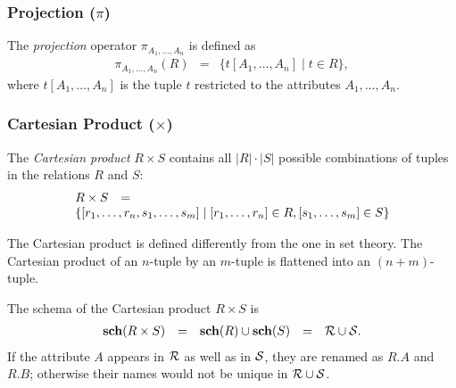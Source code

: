 

\subsubsection[Projection]{Projection ($\pi$)}

The \emph{projection} operator $\pi_{A_1, \ldots, A_n}$ is defined as
\[ \begin{array}{rcl}
\pi_{A_1, \ldots, A_n}(R) & = & \{ t[A_1, \ldots, A_n] \mid t \in R \},
\end{array} \]
where $t[A_1,\ldots,A_n]$ is the tuple $t$ restricted to the attributes $A_1, \ldots, A_n$.




\subsubsection[Cartesian Product]{Cartesian Product ($\times$)}

The  \emph{Cartesian product} $R \times S$ contains all $|R| \cdot |S|$ possible combinations of tuples in the relations $R$ and $S$:
\[ \hspace{-0.5em} \begin{array}{ll}
R \times S & = \\
\multicolumn{2}{l}{\{ [r_1,\ldots,r_n,s_1,\ldots,s_m] \mid [r_1,\ldots,r_n] \in R, [s_1,\ldots,s_m] \in S \}}
\end{array} \hspace{-0.5em} \]

\begin{note}
The Cartesian product is defined differently from the one in set theory. The Cartesian product of an $n$-tuple by an $m$-tuple is flattened into an $(n+m)$-tuple.
\end{note}

The schema of the Cartesian product $R \times S$ is
\[ \begin{array}{rclcl}
\mathbf{sch}(R \times S) & = &
\mathbf{sch}(R) \cup \mathbf{sch}(S) & = &
\mathcal{R} \cup \mathcal{S}.
\end{array} \]
If the attribute $A$ appears in $\mathcal{R}$ as well as in $\mathcal{S}$, they are renamed as $R.A$ and $R.B$; otherwise their names would not be unique in $\mathcal{R} \cup \mathcal{S}$.


